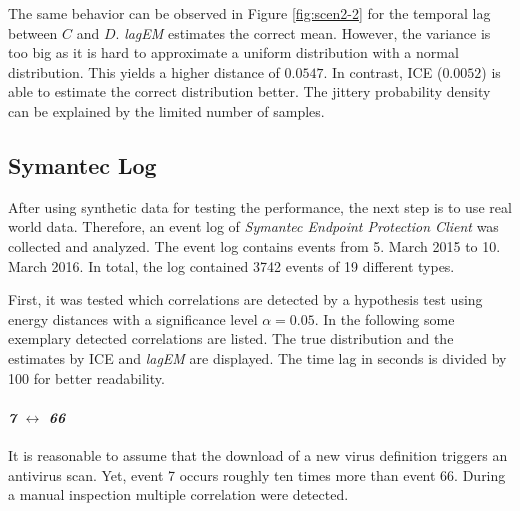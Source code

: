 \documentclass[conference]{IEEEtran}
\theoremstyle{examplestyle}
\begin{document}
The same behavior can be observed in Figure \ref{fig:scen2-2} for the temporal lag between \(C\) and \(D\). \textit{lagEM} estimates the correct mean. However, the variance is too big as it is hard to approximate a uniform distribution with a normal distribution. This yields a higher distance of $0.0547$. In contrast, \ac{ICE} ($0.0052$) is able to estimate the correct distribution better. The jittery probability density can be explained by the limited number of samples.












\subsection{Symantec Log}
\label{sec:symantecLog}

After using synthetic data for testing the performance, the next step is to use real world data. Therefore, an event log of \textit{Symantec Endpoint Protection Client} was collected and analyzed. The event log contains events from 5. March 2015 to 10. March 2016. In total, the log contained 3742 events of 19 different types.



First, it was tested which correlations are detected by a hypothesis test using energy distances with a significance level \(\alpha = 0.05\). In the following some exemplary detected correlations are listed. The true distribution and the estimates by \ac{ICE} and \textit{lagEM} are displayed. The time lag in seconds is divided by 100 for better readability.


\paragraph{\textit{7} \(\leftrightarrow\) \textit{66}} It is reasonable to assume that the download of a new virus definition triggers an antivirus scan. Yet, event 7 occurs roughly ten times more than event 66. During a manual inspection multiple correlation were detected.
\end{document}
